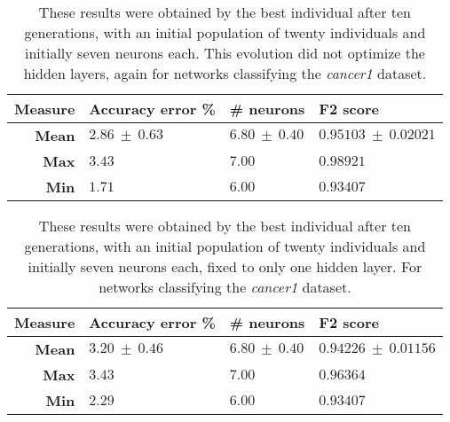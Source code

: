 \documentclass[runningheads]{llncs}
\begin{document}
 \begin{table}
     \centering
     \caption{
These results were obtained by the best individual after ten generations, with
an initial population of twenty individuals and initially seven
neurons each. %
This evolution did not optimize the hidden layers, again for networks
classifying the \emph{cancer1} dataset.}
     \label{tab:fixed-7-1-const-can1}
     \begin{tabular}{rlll}
        \textbf{Measure}   & \textbf{Accuracy error \%} & \textbf{\# neurons} & \textbf{F2 score} \\
         \hline
         \textbf{Mean}      & $2.86\ \pm\ 0.63$      & $6.80\ \pm\ 0.40$       & $0.95103\ \pm\ 0.02021$ \\
         \textbf{Max}       & $3.43$                 & $7.00$                  & $0.98921$               \\
         \textbf{Min}       & $1.71$                 & $6.00$                  & $0.93407$               \\
     \end{tabular}
 \end{table}

 \begin{table}
     \centering
     \caption{
These results were obtained by the best individual after ten generations, with
an initial population of twenty individuals and initially seven neurons each, fixed to
only one hidden layer. For networks classifying the \emph{cancer1} dataset.}
     \label{tab:fixed-7-1-inicial-can1}
     \begin{tabular}{rlll}
         \textbf{Measure}   & \textbf{Accuracy error \%} & \textbf{\# neurons} & \textbf{F2 score} \\
         \hline
         \textbf{Mean}      & $3.20\ \pm\ 0.46$      & $6.80\ \pm\ 0.40$       & $0.94226\ \pm\ 0.01156$ \\
         \textbf{Max}       & $3.43$                 & $7.00$                  & $0.96364$               \\
         \textbf{Min}       & $2.29$                 & $6.00$                  & $0.93407$               \\
     \end{tabular}
 \end{table}
\end{document}
